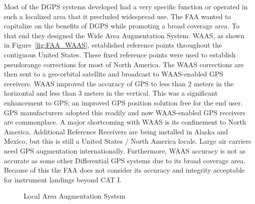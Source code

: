 Most of the DGPS systems developed had a very specific function or operated in such a localized area that it precluded widespread use. The FAA wanted to capitalize on the benefits of DGPS while promoting a broad coverage area. To that end they designed the Wide Area Augmentation System.  WAAS, as shown in Figure~\ref{fig:FAA_WAAS}, established reference points throughout the contiguous United States. These fixed reference points were used to establish pseudorange corrections for most of North America.  The WAAS corrections are then sent to a geo-orbital satellite and broadcast to WAAS-enabled GPS receivers.  WAAS improved the accuracy of GPS to less than 2 meters in the horizontal and less than 3 meters in the vertical. This was a significant enhancement to GPS; an improved GPS position solution free for the end user.  GPS manufacturers adopted this readily and now WAAS-enabled GPS receivers are commonplace. A major shortcoming with WAAS is its confinement to North America.  Additional Reference Receivers are being installed in Alaska and Mexico, but this is still a United States / North America locale. Large air carriers need GPS augmentation internationally. Furthermore, WAAS accuracy is not as accurate as some other Differential GPS systems due to its broad coverage area.  Because of this the FAA does not consider its accuracy and integrity acceptable for instrument landings beyond CAT I.

\begin{figure}
	\centering
	\caption{Local Area Augmentation System\citep[]{FAA_LAAS}}
	\label{fig:FAA_LAAS}
\end{figure}

